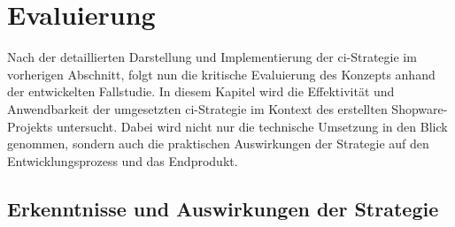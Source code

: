 
\section{Evaluierung} \label{sec:05-evaluation}

Nach der detaillierten Darstellung und Implementierung der \acrshort{ci}-Strategie im vorherigen Abschnitt, folgt nun
die kritische Evaluierung des Konzepts anhand der entwickelten Fallstudie.
In diesem Kapitel wird die Effektivität und Anwendbarkeit der umgesetzten \acrshort{ci}-Strategie im Kontext des
erstellten Shopware-Projekts untersucht.
Dabei wird nicht nur die technische Umsetzung in den Blick genommen, sondern auch die praktischen Auswirkungen der
Strategie auf den Entwicklungsprozess und das Endprodukt.

\subsection{Erkenntnisse und Auswirkungen der Strategie} \label{subsec:05-evaluation-1}

